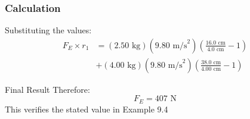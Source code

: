 \documentclass{beamer}
\begin{document}
\begin{frame}
\frametitle{Calculation}
Substituting the values:
\begin{align*}
F_E \times r_1 &= (2.50 \text{ kg})(9.80 \text{ m/s}^2)\left(\frac{16.0 \text{ cm}}{4.0 \text{ cm}}-1\right) \\
&+ (4.00 \text{ kg})(9.80 \text{ m/s}^2)\left(\frac{38.0 \text{ cm}}{4.00 \text{ cm}}-1\right)
\end{align*}

\begin{block}{Final Result}
Therefore:
\[F_E = 407 \text{ N}\]
This verifies the stated value in Example 9.4
\end{block}
\end{frame}
\end{document}
